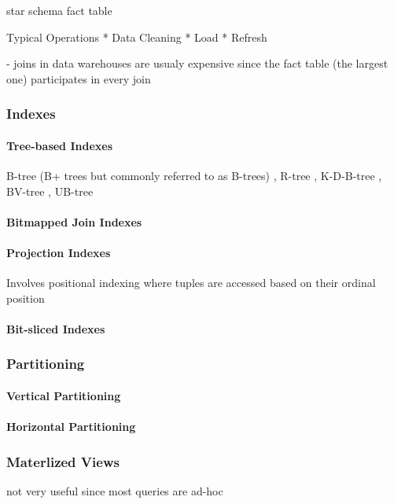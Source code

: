 \documentclass[12pt,a4paper]{article}
\begin{document}
star schema
fact table

Typical Operations
    * Data Cleaning
    * Load
    * Refresh

- joins in data warehouses are usualy expensive since the fact table (the largest one) participates in every join \cite{628286}

\subsubsection*{Indexes}
\paragraph{Tree-based Indexes}
B-tree (B+ trees but commonly referred to as B-trees) \cite{253268}, R-tree \cite{602266, Cheung20011}, K-D-B-tree \cite{582321}, BV-tree \cite{223796}, UB-tree \cite{bayer1997universal}

\paragraph{Bitmapped Join Indexes}
\cite{212001}


\paragraph{Projection Indexes}
Involves positional indexing where tuples are accessed based on their ordinal position \cite{628286}

\paragraph{Bit-sliced Indexes}


\subsubsection*{Partitioning}
\cite{thusoo2010data}
\paragraph{Vertical Partitioning}

\paragraph{Horizontal Partitioning}

\subsubsection*{Materlized Views}
not very useful since most queries are ad-hoc \cite{653447}
\cite{355309}
\end{document}
